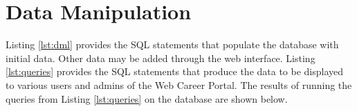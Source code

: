 \documentclass{article}
\begin{document}
    \section{Data Manipulation}
        Listing \ref{lst:dml} provides the SQL statements that populate the database with initial data. Other data may
        be added through the web interface.  Listing \ref{lst:queries} provides the SQL statements that produce the data
        to be displayed to various users and admins of the Web Career Portal.  The results of running
        the queries from Listing \ref{lst:queries} on the database are shown below. 
\end{document}
